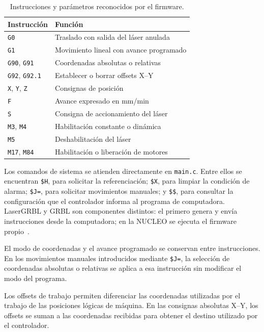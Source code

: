 \documentclass[blue,fullpaper]{ludusofficial}  %
\begin{document}
\begin{table}[htbp]
    \centering
    \small
    \caption{Instrucciones y parámetros reconocidos
    por el firmware.}
    \label{tab:gcode-admitido}
    \begin{tabular}{ll}
        \hline
        Instrucción & Función \\
        \hline
        \texttt{G0} & Traslado con salida del láser anulada \\
        \texttt{G1} & Movimiento lineal con avance programado \\
        \texttt{G90}, \texttt{G91} & Coordenadas absolutas o relativas \\
        \texttt{G92}, \texttt{G92.1} & Establecer o borrar offsets X--Y \\
        \texttt{X}, \texttt{Y}, \texttt{Z} & Consignas de posición \\
        \texttt{F} & Avance expresado en mm/min \\
        \texttt{S} & Consigna de accionamiento del láser \\
        \texttt{M3}, \texttt{M4} & Habilitación constante o dinámica \\
        \texttt{M5} & Deshabilitación del láser \\
        \texttt{M17}, \texttt{M84} & Habilitación o liberación de motores \\
        \hline
    \end{tabular}
\end{table}

Los comandos de sistema se atienden directamente
en \texttt{main.c}. Entre ellos se encuentran
\texttt{\$H}, para solicitar la referenciación;
\texttt{\$X}, para limpiar la condición de alarma;
\texttt{\$J=}, para solicitar movimientos manuales;
y \texttt{\$\$}, para consultar la configuración
que el controlador informa al programa de computadora. LaserGRBL y GRBL son componentes distintos: el primero genera y envía instrucciones desde la computadora; en la NUCLEO se ejecuta el firmware propio~\cite{lasergrbl_config}.

El modo de coordenadas y el avance programado se conservan
entre instrucciones. En los movimientos manuales
introducidos mediante \texttt{\$J=}, la selección
de coordenadas absolutas o relativas se aplica
a esa instrucción sin modificar el modo del programa.

Los offsets de trabajo permiten diferenciar las
coordenadas utilizadas por el trabajo de las posiciones
lógicas de máquina. En las consignas absolutas X--Y,
los offsets se suman a las coordenadas recibidas
para obtener el destino utilizado por el controlador.
\end{document}
